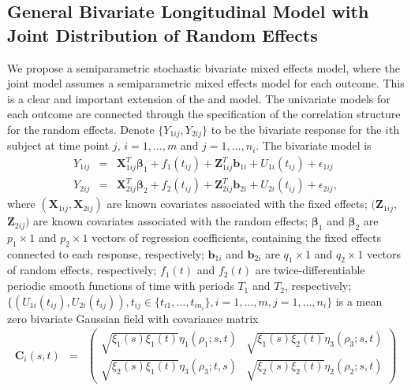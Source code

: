 \documentclass[12pt, notitlepage]{article}
\begin{document}
\subsection{General Bivariate Longitudinal Model with Joint Distribution of Random Effects}
We propose a semiparametric stochastic bivariate mixed effects model, where the joint model assumes a semiparametric mixed effects model for each outcome. 
This is a clear and important extension of the \citet {Zhang:1998} and \citet{Zhan:Lin:Sowe:quan:2000} model. 
The univariate models for each outcome are connected  through the specification of the correlation structure for the random effects.
Denote $\{Y_{1ij}, Y_{2ij}\}$ to be the bivariate response for the $i$th subject at time point $j$, 
$i = 1, \dots, m$ and $j = 1, \dots, n_i$. 
The bivariate model is
\begin{eqnarray} \label{biv}
Y_{1ij} 
&=& 
\bm{X}_{1ij}^T\bm{\beta}_1 + f_1(t_{ij}) + \bm{Z}_{1ij}^T
\bm{b}_{1i} + 
U_{1i}(t_{ij}) + 
\epsilon_{1ij}
 \nonumber 
\\
Y_{2ij} 
&=& 
\bm X_{2ij}^T \bm \beta_2 + f_2(t_{ij}) + \bm Z_{2ij}^T
\bm b_{2i} + 
U_{2i}(t_{ij}) + \epsilon_{2ij}, 
\end{eqnarray}
where 
$(\bm X_{1ij}, \bm X_{2ij})$ are known covariates associated with the fixed effects; 
$(\bm Z_{1ij}$, $\bm Z_{2ij})$ are known covariates associated with the random effects; 
$\bm \beta_1$ and $\bm \beta_2$ are $p_1 \times 1$ and $p_2 \times 1$ vectors of regression coefficients, containing the fixed effects connected to each response,
 respectively; 
$\bm b_{1i}$ and $\bm b_{2i}$ are $q_1 \times 1$ and $q_2 \times 1$ vectors of random effects, respectively; 
$f_1(t)$ and $f_2(t)$ are  twice-differentiable periodic smooth functions of time with  periods $T_1$ and $T_2$, respectively; 
$\{(U_{1i}(t_{ij}), U_{2i}(t_{ij})), t_{ij} \in \{t_{i1}, \dots, t_{in_i}\}, i = 1, \dots, m, j = 1, \dots, n_i  \}$ is a mean zero bivariate Gaussian field  with 
covariance matrix 
\begin{eqnarray*}
\boldsymbol C_i(s, t) &=&
  \begin{pmatrix}
 \sqrt {\xi_1(s) \xi_1(t)} \eta_1(\rho_1; s, t) &   \sqrt {\xi_1(s) \xi_2(t)} \eta_3(\rho_3; s, t)
  \\
 \sqrt {\xi_2(s) \xi_1(t)} \eta_3(\rho_3; t, s)
 &   \sqrt {\xi_2(s) \xi_2(t)} \eta_2(\rho_2; s, t)
 \end{pmatrix}
\end{eqnarray*}
\end{document}
